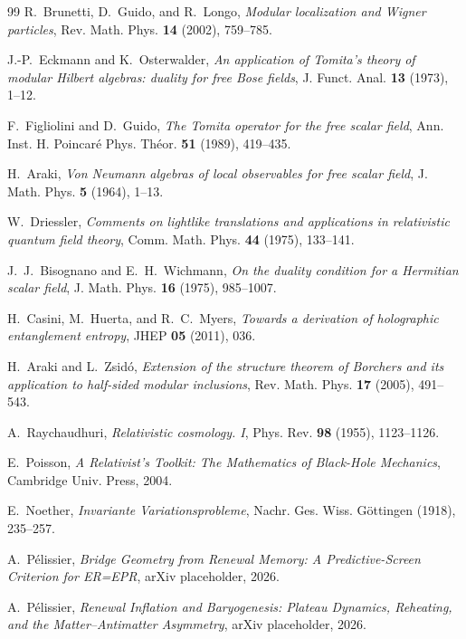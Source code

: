 \documentclass[11pt]{article}
\theoremstyle{definition}
\theoremstyle{remark}
\begin{document}
\begin{thebibliography}{99}
R.~Brunetti, D.~Guido, and R.~Longo, \emph{Modular localization and Wigner
particles}, Rev. Math. Phys. \textbf{14} (2002), 759--785.

J.-P.~Eckmann and K.~Osterwalder, \emph{An application of Tomita's theory of
modular Hilbert algebras: duality for free Bose fields}, J. Funct. Anal.
\textbf{13} (1973), 1--12.

F.~Figliolini and D.~Guido, \emph{The Tomita operator for the free scalar field},
Ann. Inst. H. Poincar\'e Phys. Th\'eor. \textbf{51} (1989), 419--435.

H.~Araki, \emph{Von Neumann algebras of local observables for free scalar field},
J. Math. Phys. \textbf{5} (1964), 1--13.

W.~Driessler, \emph{Comments on lightlike translations and applications in
relativistic quantum field theory}, Comm. Math. Phys. \textbf{44} (1975), 133--141.

J.~J.~Bisognano and E.~H.~Wichmann,
\emph{On the duality condition for a Hermitian scalar field},
J. Math. Phys. \textbf{16} (1975), 985--1007.

H.~Casini, M.~Huerta, and R.~C.~Myers,
\emph{Towards a derivation of holographic entanglement entropy},
JHEP \textbf{05} (2011), 036.

H.~Araki and L.~Zsid\'o,
\emph{Extension of the structure theorem of Borchers and its application to
half-sided modular inclusions}, Rev. Math. Phys. \textbf{17} (2005), 491--543.

A.~Raychaudhuri, \emph{Relativistic cosmology. I},
Phys. Rev. \textbf{98} (1955), 1123--1126.

E.~Poisson, \emph{A Relativist's Toolkit: The Mathematics of Black-Hole
Mechanics}, Cambridge Univ. Press, 2004.

E.~Noether, \emph{Invariante Variationsprobleme}, Nachr. Ges. Wiss. G\"ottingen
(1918), 235--257.

A.~P\'elissier,
\emph{Bridge Geometry from Renewal Memory: A Predictive-Screen Criterion for
ER=EPR}, arXiv placeholder, 2026.

A.~P\'elissier,
\emph{Renewal Inflation and Baryogenesis: Plateau Dynamics, Reheating, and the Matter--Antimatter Asymmetry},
arXiv placeholder, 2026.


\end{thebibliography}
\end{document}
